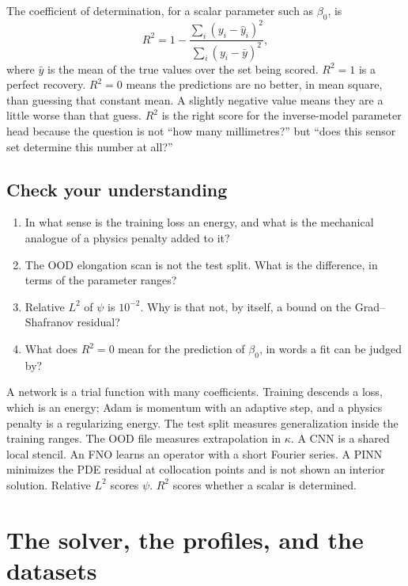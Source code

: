 \documentclass[11pt,a4paper,oneside,openany]{book}
\numberwithin{equation}{chapter}
\theoremstyle{definition}
\begin{document}
The coefficient of determination, for a scalar parameter such as \(\beta_{0}\), is
\begin{equation}
\label{eq:r2}
R^{2}=1-\frac{\sum_{i}(y_{i}-\hat{y}_{i})^{2}}{\sum_{i}(y_{i}-\bar{y})^{2}},
\end{equation}
where \(\bar{y}\) is the mean of the true values over the set being scored. \(R^{2}=1\) is a perfect recovery. \(R^{2}=0\) means the predictions are no better, in mean square, than guessing that constant mean. A slightly negative value means they are a little worse than that guess. \(R^{2}\) is the right score for the inverse-model parameter head because the question is not ``how many millimetres?'' but ``does this sensor set determine this number at all?''

\section*{Check your understanding}
\begin{enumerate}[label=\textbf{Q8.\arabic*.},leftmargin=2.4em]
\item In what sense is the training loss an energy, and what is the mechanical analogue of a physics penalty added to it?
\item The OOD elongation scan is not the test split. What is the difference, in terms of the parameter ranges?
\item Relative \(L^{2}\) of \(\psi\) is \(10^{-2}\). Why is that not, by itself, a bound on the Grad--Shafranov residual?
\item What does \(R^{2}=0\) mean for the prediction of \(\beta_{0}\), in words a fit can be judged by?
\end{enumerate}

\begin{keyideas}
A network is a trial function with many coefficients. Training descends a loss, which is an energy; Adam is momentum with an adaptive step, and a physics penalty is a regularizing energy. The test split measures generalization inside the training ranges. The OOD file measures extrapolation in \(\kappa\). A CNN is a shared local stencil. An FNO learns an operator with a short Fourier series. A PINN minimizes the PDE residual at collocation points and is not shown an interior solution. Relative \(L^{2}\) scores \(\psi\). \(R^{2}\) scores whether a scalar is determined.
\end{keyideas}

\chapter{The solver, the profiles, and the datasets}
\label{ch:code}
\end{document}
